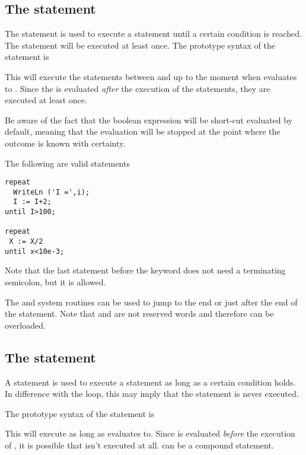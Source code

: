 \subsection{The  statement}
 
The  statement is used to execute a statement until a certain
condition is reached. The statement will be executed at least once.
The prototype syntax of the  statement is

This will execute the statements between  and  up to
the moment when  evaluates to .
Since the  is evaluated {\em after} the execution of the
statements, they are executed at least once.

Be aware of the fact that the boolean expression  will be 
short-cut evaluated by default, meaning that the evaluation will be stopped 
at the point where the outcome is known with certainty.

The following are valid  statements
\begin{verbatim}
repeat
  WriteLn ('I =',i);
  I := I+2;
until I>100;

repeat
 X := X/2
until x<10e-3;
\end{verbatim}
Note that the last statement before the  keyword does not need
a terminating semicolon, but it is allowed.

The  and  system routines can be used to jump to
the end or just after the end of the  statement.
Note that  and  are not reserved words and
therefore can be overloaded.

\subsection{The  statement}
 
A  statement is used to execute a statement as long as a certain
condition holds. In difference with the  loop, this may imply 
that the statement is never executed.

The prototype syntax of the  statement is

This will execute  as long as  evaluates
to. Since  is evaluated {\em before} the execution
of , it is possible that  isn't executed at
all.  can be a compound statement.

